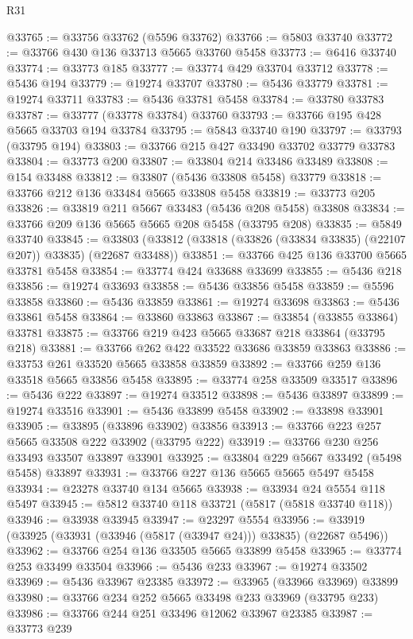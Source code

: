 \begin{lexlean}{R31}
\begin{coremodule}
@33765 := @33756 @33762 (@5596 @33762)
@33766 := @5803 @33740
@33772 := @33766 @430 @136 @33713 @5665 @33760 @5458
@33773 := @6416 @33740
@33774 := @33773 @185
@33777 := @33774 @429 @33704 @33712
@33778 := @5436 @194
@33779 := @19274 @33707
@33780 := @5436 @33779
@33781 := @19274 @33711
@33783 := @5436 @33781 @5458
@33784 := @33780 @33783
@33787 := @33777 (@33778 @33784) @33760
@33793 := @33766 @195 @428 @5665 @33703 @194 @33784
@33795 := @5843 @33740 @190
@33797 := @33793 (@33795 @194)
@33803 := @33766 @215 @427 @33490 @33702 @33779 @33783
@33804 := @33773 @200
@33807 := @33804 @214 @33486 @33489
@33808 := @154 @33488
@33812 := @33807 (@5436 @33808 @5458) @33779
@33818 := @33766 @212 @136 @33484 @5665 @33808 @5458
@33819 := @33773 @205
@33826 := @33819 @211 @5667 @33483 (@5436 @208 @5458) @33808
@33834 := @33766 @209 @136 @5665 @5665 @208 @5458 (@33795 @208)
@33835 := @5849 @33740
@33845 := @33803 (@33812 (@33818 (@33826 (@33834 @33835) (@22107 @207)) @33835) (@22687 @33488))
@33851 := @33766 @425 @136 @33700 @5665 @33781 @5458
@33854 := @33774 @424 @33688 @33699
@33855 := @5436 @218
@33856 := @19274 @33693
@33858 := @5436 @33856 @5458
@33859 := @5596 @33858
@33860 := @5436 @33859
@33861 := @19274 @33698
@33863 := @5436 @33861 @5458
@33864 := @33860 @33863
@33867 := @33854 (@33855 @33864) @33781
@33875 := @33766 @219 @423 @5665 @33687 @218 @33864 (@33795 @218)
@33881 := @33766 @262 @422 @33522 @33686 @33859 @33863
@33886 := @33753 @261 @33520 @5665 @33858 @33859
@33892 := @33766 @259 @136 @33518 @5665 @33856 @5458
@33895 := @33774 @258 @33509 @33517
@33896 := @5436 @222
@33897 := @19274 @33512
@33898 := @5436 @33897
@33899 := @19274 @33516
@33901 := @5436 @33899 @5458
@33902 := @33898 @33901
@33905 := @33895 (@33896 @33902) @33856
@33913 := @33766 @223 @257 @5665 @33508 @222 @33902 (@33795 @222)
@33919 := @33766 @230 @256 @33493 @33507 @33897 @33901
@33925 := @33804 @229 @5667 @33492 (@5498 @5458) @33897
@33931 := @33766 @227 @136 @5665 @5665 @5497 @5458
@33934 := @23278 @33740 @134 @5665
@33938 := @33934 @24 @5554 @118 @5497
@33945 := @5812 @33740 @118 @33721 (@5817 (@5818 @33740 @118))
@33946 := @33938 @33945
@33947 := @23297 @5554
@33956 := @33919 (@33925 (@33931 (@33946 (@5817 (@33947 @24))) @33835) (@22687 @5496))
@33962 := @33766 @254 @136 @33505 @5665 @33899 @5458
@33965 := @33774 @253 @33499 @33504
@33966 := @5436 @233
@33967 := @19274 @33502
@33969 := @5436 @33967 @23385
@33972 := @33965 (@33966 @33969) @33899
@33980 := @33766 @234 @252 @5665 @33498 @233 @33969 (@33795 @233)
@33986 := @33766 @244 @251 @33496 @12062 @33967 @23385
@33987 := @33773 @239

\end{coremodule}
\end{lexlean}
